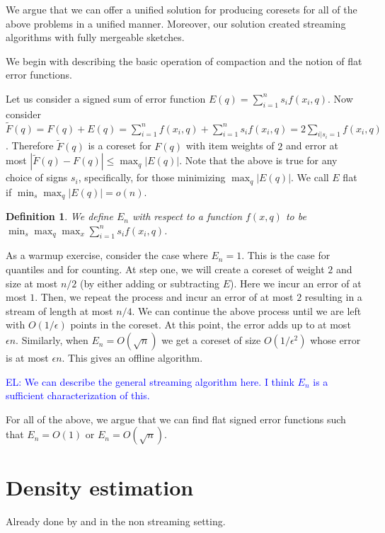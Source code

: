 \documentclass{article} %
\newcommand{\el}[1]{\textcolor{blue}{EL: #1}}
\newcommand{\eps}{\epsilon}
\newtheorem{definition}{Definition}
\begin{document}
We argue that we can offer a unified solution for producing coresets for all of the above problems in a unified manner. 
Moreover, our solution created streaming algorithms with fully mergeable sketches. 

We begin with describing the basic operation of compaction and the notion of flat error functions. 

Let us consider a signed sum of error function $E(q) = \sum_{i=1}^{n} s_i f(x_i,q)$.
Now consider $\tilde F(q) = F(q) + E(q) = \sum_{i=1}^{n} f(x_i,q)  + \sum_{i=1}^{n} s_i f(x_i,q)  = 2 \sum_{i | s_i=1} f(x_i,q)$.
Therefore $\tilde F(q)$ is a coreset for $F(q)$ with item weights of $2$ and error at most $|\tilde F(q) - F(q)| \le \max_q | E(q)|$.
Note that the above is true for any choice of signs $s_i$, specifically, for those minimizing $\max_q | E(q)|$.
We call $E$ flat if $\min_s \max_q |E(q)| = o(n)$. 

\begin{definition}
We define $E_n$ with respect to a function $f(x,q)$ to be  $\min_s \max_q \max_x \sum_{i=1}^{n} s_i f(x_i,q)$. 
\end{definition}

As a warmup exercise, consider the case where $E_n = 1$.
This is the case for quantiles and for counting. 
At step one, we will create a coreset of weight $2$ and size at most $n/2$ (by either adding or subtracting $E$). Here we incur an error of at most $1$.
Then, we repeat the process and incur an error of at most $2$ resulting in a stream of length at most $n/4$. 
We can continue the above process until we are left with $O(1/\eps)$ points in the coreset. At this point, the error adds up to at most $\eps n$.
Similarly, when $E_n = O(\sqrt{n})$ we get a coreset of size $O(1/\eps^2)$ whose error is at most $\eps n$.
This gives an offline algorithm.

\el{We can describe the general streaming algorithm here. I think $E_n$ is a sufficient characterization of this.} 


For all of the above, we argue that we can find flat signed error functions such that $E_n = O(1)$ or $E_n = O(\sqrt{n})$.




\section{Density estimation}

Already done by \cite{DBLP:conf/soda/PhillipsT18} and \cite{DBLP:journals/corr/abs-1802-01751} in the non streaming setting.
\end{document}
